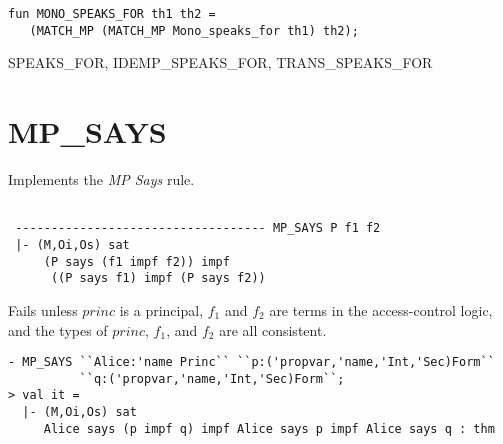\IMPLEMENTATION
\begin{holboxed}
\begin{verbatim}
fun MONO_SPEAKS_FOR th1 th2 =
   (MATCH_MP (MATCH_MP Mono_speaks_for th1) th2);
\end{verbatim}
\end{holboxed}

\SEEALSO
SPEAKS\_FOR, IDEMP\_SPEAKS\_FOR, TRANS\_SPEAKS\_FOR
\ENDDOC

\section{MP\_SAYS}





\egroup

\SYNOPSIS
Implements the \emph{MP Says} rule.

\DESCRIBE

\begin{verbatim}

 ----------------------------------- MP_SAYS P f1 f2
 |- (M,Oi,Os) sat 
     (P says (f1 impf f2)) impf 
      ((P says f1) impf (P says f2))
\end{verbatim}

\FAILURE 
Fails unless $princ$ is a principal, $f_1$ and $f_2$ are
terms in the access-control logic, and the types of $princ$, $f_1$,
and $f_2$ are all consistent.

\EXAMPLE
\begin{holboxed}
\begin{verbatim}
- MP_SAYS ``Alice:'name Princ`` ``p:('propvar,'name,'Int,'Sec)Form`` 
          ``q:('propvar,'name,'Int,'Sec)Form``;
> val it =
  |- (M,Oi,Os) sat
     Alice says (p impf q) impf Alice says p impf Alice says q : thm
\end{verbatim}
\end{holboxed}

